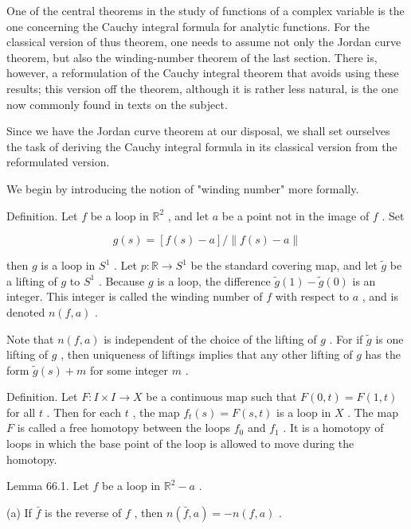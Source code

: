 \documentclass[10pt]{article}
\begin{document}
One of the central theorems in the study of functions of a complex variable is the one concerning the Cauchy integral formula for analytic functions. For the classical version of thus theorem, one needs to assume not only the Jordan curve theorem, but also the winding-number theorem of the last section. There is, however, a reformulation of the Cauchy integral theorem that avoids using these results; this version off the theorem, although it is rather less natural, is the one now commonly found in texts on the subject.

Since we have the Jordan curve theorem at our disposal, we shall set ourselves the task of deriving the Cauchy integral formula in its classical version from the reformulated version.

We begin by introducing the notion of "winding number" more formally.

Definition. Let \(f\) be a loop in \({\mathbb{R}}^{2}\) , and let \(a\) be a point not in the image of \(f\) . Set

\[
g\left( s\right)  = \left\lbrack  {f\left( s\right)  - a}\right\rbrack  /\parallel f\left( s\right)  - a\parallel
\]

then \(g\) is a loop in \({S}^{1}\) . Let \(p : \mathbb{R} \rightarrow  {S}^{1}\) be the standard covering map, and let \(\widetilde{g}\) be a lifting of \(g\) to \({S}^{1}\) . Because \(g\) is a loop, the difference \(\widetilde{g}\left( 1\right)  - \widetilde{g}\left( 0\right)\) is an integer. This integer is called the winding number of \(f\) with respect to \(a\) , and is denoted \(n\left( {f,a}\right)\) .

Note that \(n\left( {f,a}\right)\) is independent of the choice of the lifting of \(g\) . For if \(\widetilde{g}\) is one lifting of \(g\) , then uniqueness of liftings implies that any other lifting of \(g\) has the form \(\widetilde{g}\left( s\right)  + m\) for some integer \(m\) .

Definition. Let \(F : I \times  I \rightarrow  X\) be a continuous map such that \(F\left( {0,t}\right)  = F\left( {1,t}\right)\) for all \(t\) . Then for each \(t\) , the map \({f}_{t}\left( s\right)  = F\left( {s,t}\right)\) is a loop in \(X\) . The map \(F\) is called a free homotopy between the loops \({f}_{0}\) and \({f}_{1}\) . It is a homotopy of loops in which the base point of the loop is allowed to move during the homotopy.

Lemma 66.1. Let \(f\) be a loop in \({\mathbb{R}}^{2} - a\) .

(a) If \(\bar{f}\) is the reverse of \(f\) , then \(n\left( {\bar{f},a}\right)  =  - n\left( {f,a}\right)\) .
\end{document}
